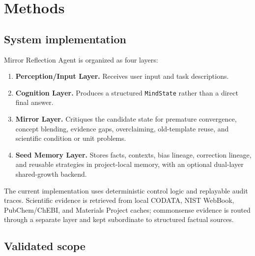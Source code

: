 \documentclass[12pt]{article}
\begin{document}
\section{Methods}

\subsection{System implementation}

Mirror Reflection Agent is organized as four layers:
\begin{enumerate}
\item \textbf{Perception/Input Layer.} Receives user input and task descriptions.
\item \textbf{Cognition Layer.} Produces a structured \texttt{MindState} rather than a direct final answer.
\item \textbf{Mirror Layer.} Critiques the candidate state for premature convergence, concept blending, evidence gaps, overclaiming, old-template reuse, and scientific condition or unit problems.
\item \textbf{Seed Memory Layer.} Stores facts, contexts, bias lineage, correction lineage, and reusable strategies in project-local memory, with an optional dual-layer shared-growth backend.
\end{enumerate}

The current implementation uses deterministic control logic and replayable audit traces. Scientific evidence is retrieved from local CODATA, NIST WebBook, PubChem/ChEBI, and Materials Project caches; commonsense evidence is routed through a separate layer and kept subordinate to structured factual sources.

\subsection{Validated scope}
\end{document}
